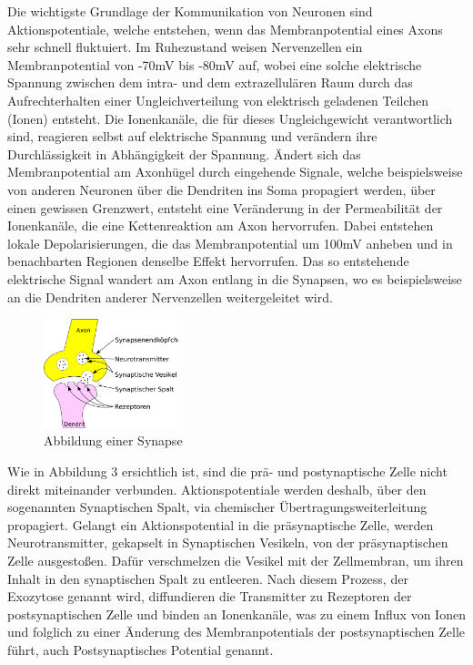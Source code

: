 Die wichtigste Grundlage der Kommunikation von Neuronen sind Aktionspotentiale, welche entstehen, wenn das Membranpotential eines Axons sehr schnell fluktuiert. Im Ruhezustand weisen Nervenzellen ein Membranpotential von -70mV bis -80mV auf, wobei eine solche elektrische Spannung zwischen dem intra- und dem extrazellulären Raum durch das Aufrechterhalten einer Ungleichverteilung von elektrisch geladenen Teilchen (Ionen) entsteht. Die Ionenkanäle, die für dieses Ungleichgewicht verantwortlich sind, reagieren selbst auf elektrische Spannung und verändern ihre Durchlässigkeit in Abhängigkeit der Spannung. Ändert sich das Membranpotential am Axonhügel durch eingehende Signale, welche beispielsweise von anderen Neuronen über die Dendriten ins Soma propagiert werden, über einen gewissen Grenzwert, entsteht eine Veränderung in der Permeabilität der Ionenkanäle, die eine Kettenreaktion am Axon hervorrufen. Dabei entstehen lokale Depolarisierungen, die das Membranpotential um 100mV anheben und in benachbarten Regionen denselbe Effekt hervorrufen. Das so entstehende elektrische Signal wandert am Axon entlang in die Synapsen, wo es beispielsweise an die Dendriten anderer Nervenzellen weitergeleitet wird. \par
\begin{figure}
	\centering
	\includegraphics[width=0.35\textwidth]{abb/synapse.png}
	\caption{Abbildung einer Synapse}
\end{figure}
Wie in Abbildung 3 ersichtlich ist, sind die prä- und postynaptische Zelle nicht direkt miteinander verbunden. Aktionspotentiale werden deshalb, über den sogenannten Synaptischen Spalt, via chemischer Übertragungsweiterleitung propagiert. Gelangt ein Aktionspotential in die präsynaptische Zelle, werden Neurotransmitter, gekapselt in Synaptischen Vesikeln, von der präsynaptischen Zelle ausgestoßen. Dafür verschmelzen die Vesikel mit der Zellmembran, um ihren Inhalt in den synaptischen Spalt zu entleeren. Nach diesem Prozess, der Exozytose genannt wird, diffundieren die Transmitter zu Rezeptoren der postsynaptischen Zelle und binden an Ionenkanäle, was zu einem Influx von Ionen und folglich zu einer Änderung des Membranpotentials der postsynaptischen Zelle führt, auch Postsynaptisches Potential genannt.
